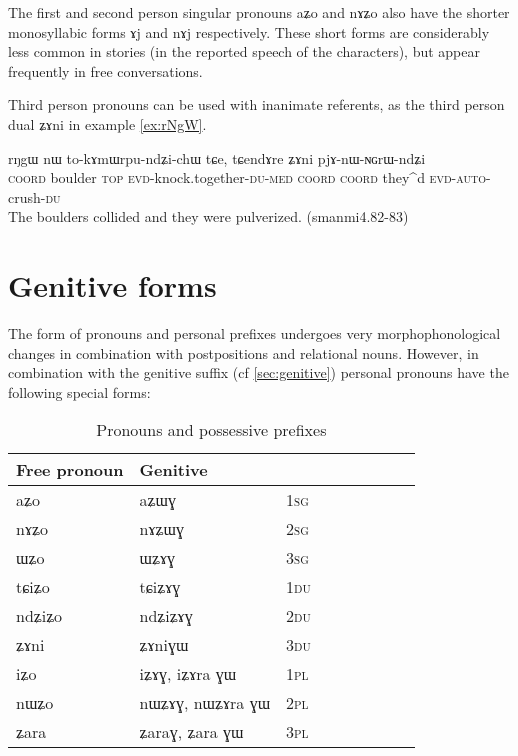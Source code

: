 \documentclass[oldfontcommands,oneside,a4paper,11pt]{memoir}
\newcommand{\ipa}[1]{{\phon #1}} %
\newcommand{\du}{\textsc{du}}
\newcommand{\pl}{\textsc{pl}}
\newcommand{\sg}{\textsc{sg}}
\begin{document}
The first and second person singular pronouns  \ipa{aʑo} and \ipa{nɤʑo} also have the shorter monosyllabic forms \ipa{ɤj} and \ipa{nɤj} respectively. These short forms are considerably less common in stories (in the reported speech of the characters), but appear frequently in free conversations.


Third person pronouns can be used with inanimate referents, as the third person dual \ipa{ʑɤni} in example \ref{ex:rNgW}.
\begin{exe}
\ex \label{ex:rNgW}
\gll \ipa{tɕe}   	\ipa{rŋgɯ}   	\ipa{nɯ}   	\ipa{to-kɤmɯrpu-ndʑi-chɯ}   	\ipa{tɕe,}   	\ipa{tɕendɤre}   	\ipa{ʑɤni}   	\ipa{pjɤ-nɯ-ɴɢrɯ-ndʑi}   \\
\textsc{coord} boulder \textsc{top} \textsc{evd}-knock.together-\textsc{du-med} \textsc{coord} \textsc{coord} they^{d} \textsc{evd-auto}-crush-\textsc{du} \\
\glt The boulders collided and they were pulverized. (smanmi4.82-83)
\end{exe}




\section{Genitive forms} \label{sec:pronouns.gen}
The form of pronouns and personal prefixes undergoes very morphophonological changes in combination with postpositions and relational nouns. However, in combination with the genitive suffix  (cf \ref{sec:genitive})  personal pronouns have the following special forms:




\begin{table}[H] \centering
\caption{Pronouns and possessive prefixes }\label{tab:pronoun}
\begin{tabular}{lllllllll} \toprule
 Free pronoun & Genitive & \\
\midrule
 \ipa{aʑo}  &	\ipa{aʑɯɣ}  &		1\sg{} \\ 
\ipa{nɤʑo}  &	\ipa{nɤʑɯɣ}  &			2\sg{} \\ 
\ipa{ɯʑo}  &	\ipa{ɯʑɤɣ}  &			3\sg{} \\ 
\ipa{tɕiʑo}  &	\ipa{tɕiʑɤɣ}  &			1\du{} \\ 
\ipa{ndʑiʑo}  &	\ipa{ndʑiʑɤɣ}  &		2\du{} \\	 
\ipa{ʑɤni}  &	\ipa{ʑɤniɣɯ}  &		3\du{} \\	 
\ipa{iʑo}  &	\ipa{iʑɤɣ}, 	\ipa{iʑɤra ɣɯ}   &			1\pl{} \\ 
\ipa{nɯʑo}  &	\ipa{nɯʑɤɣ}, 	\ipa{nɯʑɤra ɣɯ}  &			2\pl{} \\ 
\ipa{ʑara}  &	\ipa{ʑaraɣ},   \ipa{ʑara ɣɯ}&			3\pl{}  \\  
\bottomrule
\end{tabular}
\end{table}
\end{document}

